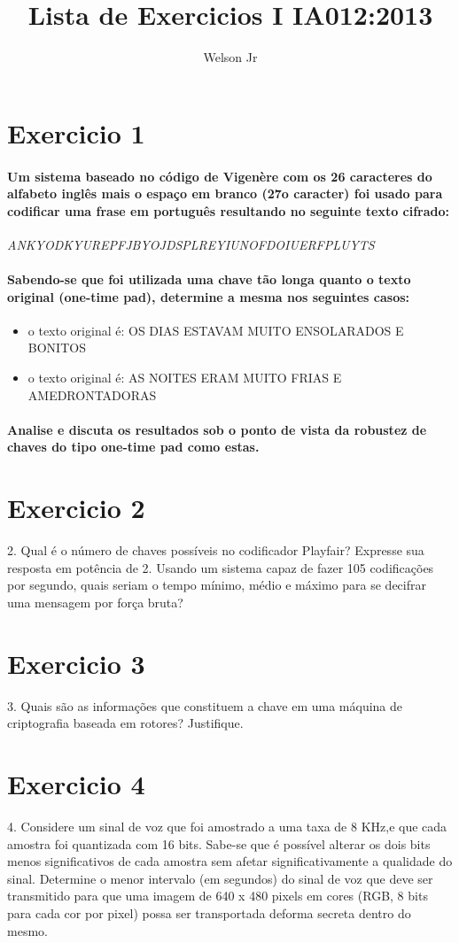 \documentclass[10pt,a4paper]{report}
\author{Welson Jr}
\title{Lista de Exercicios I IA012:2013}
\begin{document}
\section{Exercicio 1}
\paragraph{Um sistema baseado no código de Vigenère com os 26 caracteres do alfabeto inglês mais o espaço em branco (27o caracter) foi usado para codificar uma frase em português resultando no seguinte texto cifrado:}
\emph{ANKYODKYUREPFJBYOJDSPLREYIUNOFDOIUERFPLUYTS}
\paragraph{ Sabendo-se que foi utilizada uma chave tão longa quanto o texto original (one-time pad), determine a mesma nos seguintes casos:}
\begin{itemize}
\item o texto original é: OS DIAS ESTAVAM MUITO ENSOLARADOS E BONITOS
\item o texto original é: AS NOITES ERAM MUITO FRIAS E AMEDRONTADORAS
\end{itemize}
\paragraph{ Analise e discuta os resultados sob o ponto de vista da robustez de chaves do tipo one-time pad como estas.}
\section{Exercicio 2}
2. Qual é o número de chaves possíveis no codificador Playfair? Expresse sua resposta em potência de 2. Usando um sistema capaz de fazer 105 codificações por segundo, quais seriam o tempo mínimo, médio e máximo para se decifrar uma mensagem por força bruta?
\section{Exercicio 3}
3. Quais são as informações que constituem a chave em uma máquina de criptografia baseada em rotores? Justifique.
\section{Exercicio 4}
4. Considere um sinal de voz que foi amostrado a uma taxa de 8 KHz,e que cada amostra foi quantizada com 16 bits. Sabe-se que é possível alterar os dois bits menos significativos de cada amostra sem afetar significativamente a qualidade do sinal. Determine o menor intervalo (em segundos) do sinal de voz que deve ser transmitido para que uma imagem de 640 x 480 pixels em cores (RGB, 8 bits para cada cor por pixel) possa ser transportada deforma secreta dentro do mesmo.
\end{document}
